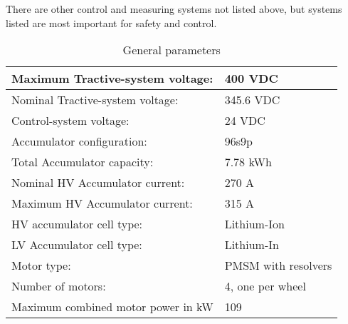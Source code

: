 There are other control and measuring systems not listed above, but systems listed are most important for safety and control.  

\iffalse
\begin{itemize}
\item Short description of the system’s concept 
\item Rough Schematic (blocks) showing all parts affected with the electrical systems and function of the tractive-system
\item No detailed wiring
\item Additionally, fill out the following table, replacing the values with your specifications:
\end{itemize}
\fi

\begin{table}[H]
	\centering
	\caption{General parameters}
	\begin{tabularx}{\textwidth}{|X|X|}
		\hline
		Maximum Tractive-system voltage: & 400 VDC  \\[\TableSize]
		\hline Nominal Tractive-system voltage: & 345.6 VDC\\[\TableSize]
		\hline
		Control-system voltage: & 24 VDC \\[\TableSize]
		\hline
		Accumulator configuration: & 96s9p \\[\TableSize]
		\hline
		Total Accumulator capacity: & 7.78 kWh\\[\TableSize]
		\hline
		Nominal HV Accumulator current: & 270 A \\[\TableSize]
		\hline
		Maximum HV Accumulator current: & 315 A \\[\TableSize]
		\hline
		HV accumulator cell type: & Lithium-Ion  \\[\TableSize]
		\hline
		LV Accumulator cell type: & Lithium-In \\[\TableSize]
		\hline
		Motor type: & PMSM with resolvers \\[\TableSize]
		\hline
		Number of motors: &  4, one per wheel \\[\TableSize]
		\hline
		Maximum combined motor power in kW & 109 \\[\TableSize]
		\hline
	\end{tabularx}%
	\label{tab:system-general}%
\end{table}%

